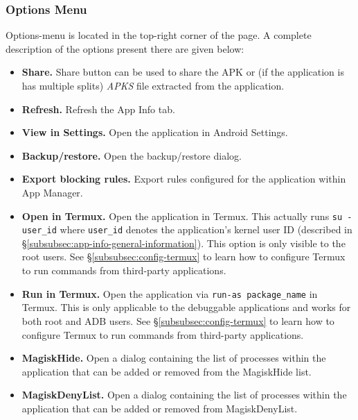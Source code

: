\subsubsection{Options Menu}\label{subsubsec:app-info-options-menu} %
Options-menu is located in the top-right corner of the page. A complete description of the options present there are
given below:
\begin{itemize}
    \item \textbf{Share.} Share button can be used to share the APK or (if the application is has multiple splits)
    \textit{APKS} file extracted from the application.

    \item \textbf{Refresh.} Refresh the App Info tab.

    \item \textbf{View in Settings.} Open the application in Android Settings.

    \item \textbf{Backup/restore.} Open the backup/restore dialog.

    \item \textbf{Export blocking rules.} Export rules configured for the application within App Manager.

    \item \textbf{Open in Termux.} Open the application in Termux. This actually runs \texttt{su - user\_id} where
    \texttt{user\_id} denotes the application's kernel user ID (described in §\ref{subsubsec:app-info-general-information}).
    This option is only visible to the root users. See §\ref{subsubsec:config-termux} to learn how to configure Termux
    to run commands from third-party applications.

    \item \textbf{Run in Termux.} Open the application via \texttt{run-as package\_name} in Termux. This is only
    applicable to the debuggable applications and works for both root and ADB users. See §\ref{subsubsec:config-termux}
    to learn how to configure Termux to run commands from third-party applications.

    \item \textbf{MagiskHide.} Open a dialog containing the list of processes within the application that can be added
    or removed from the MagiskHide list.

    \item \textbf{MagiskDenyList.} Open a dialog containing the list of processes within the application that can be
    added or removed from MagiskDenyList.


\end{itemize}
